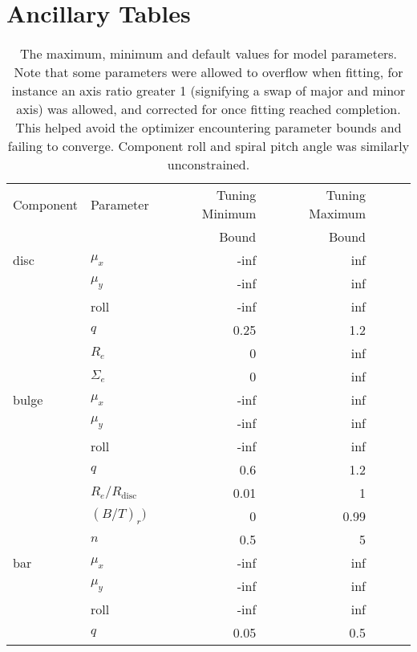 \documentclass[../main.tex]{subfiles}
\begin{document}
\section{Ancillary Tables}
\begin{table*}
  \centering
  \caption{The maximum, minimum and default values for model parameters. Note that some parameters were allowed to overflow when fitting, for instance an axis ratio greater 1 (signifying a swap of major and minor axis) was allowed, and corrected for once fitting reached completion. This helped avoid the optimizer encountering parameter bounds and failing to converge. Component roll and spiral pitch angle was similarly unconstrained.}
  \begin{tabular}{l|l|r|r|r|r|r}
\hline
Component & Parameter  & Tuning Minimum & Tuning Maximum \\
          &            &  Bound         & Bound          \\
\hline
disc      & $\mu_x$    & -inf           & inf            \\
          & $\mu_y$    & -inf           & inf            \\
          & roll       & -inf           & inf            \\
          & $q$        & 0.25           & 1.2            \\
          & $R_e$      & 0              & inf            \\
          & $\Sigma_e$ & 0              & inf            \\
bulge     & $\mu_x$    & -inf           & inf            \\
          & $\mu_y$    & -inf           & inf            \\
          & roll       & -inf           & inf            \\
          & $q$        & 0.6            & 1.2            \\
          & $R_e / R_\mathrm{disc}$ & 0.01 & 1           \\
          & $(B/T)_r)$ & 0              & 0.99           \\
          & $n$        & 0.5            & 5              \\
bar       & $\mu_x$    & -inf           & inf            \\
          & $\mu_y$    & -inf           & inf            \\
          & roll       & -inf           & inf            \\
          & $q$        & 0.05           & 0.5            \\

\end{tabular}
\end{table*}
\end{document}
